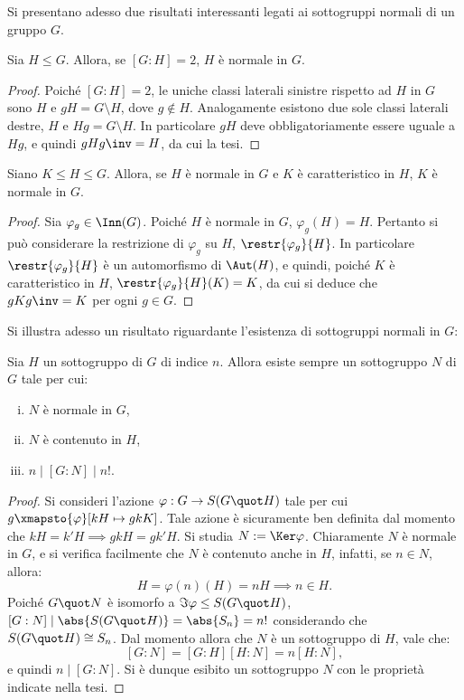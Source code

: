 \documentclass[12pt]{scrartcl}
\begin{document}
	
	Si presentano adesso due risultati interessanti legati ai sottogruppi normali di
	un gruppo $G$.
	
	\begin{proposition}
		Sia $H \leq G$. Allora, se $[G : H] = 2$, $H$ è normale in $G$.
	\end{proposition}
	
	\begin{proof}
		Poiché $[G : H] = 2$, le uniche classi laterali sinistre rispetto ad $H$ in
		$G$ sono $H$ e $gH = G \setminus H$, dove $g \notin H$. Analogamente esistono
		due sole classi laterali destre, $H$ e $Hg = G \setminus H$. In particolare
		$gH$ deve obbligatoriamente essere uguale a $Hg$, e quindi $gHg\inv = H$, da
		cui la tesi.
	\end{proof}
	
	\begin{proposition}
		Siano $K \leq H \leq G$. Allora, se $H$ è normale in $G$ e $K$ è caratteristico
		in $H$, $K$ è normale in $G$.
	\end{proposition}
	
	\begin{proof}
		Sia $\varphi_g \in \Inn(G)$. Poiché $H$ è normale in $G$, $\varphi_g(H) = H$. Pertanto
		si può considerare la restrizione di $\varphi_g$ su $H$, $\restr{\varphi_g}{H}$.
		In particolare $\restr{\varphi_g}{H}$ è un automorfismo di $\Aut(H)$, e quindi,
		poiché $K$ è caratteristico in $H$, $\restr{\varphi_g}{H}(K) = K$, da cui si
		deduce che $gKg\inv = K$ per ogni $g \in G$.
	\end{proof}
	
	Si illustra adesso un risultato riguardante l'esistenza di sottogruppi normali in $G$:
	\begin{theorem}[di Poincaré]
		Sia $H$ un sottogruppo di $G$ di indice $n$. Allora esiste sempre un sottogruppo
		$N$ di $G$ tale per cui:
		\begin{enumerate}[(i)]
			\item $N$ è normale in $G$,
			\item $N$ è contenuto in $H$,
			\item $n \mid [G : N] \mid n!$.
		\end{enumerate}
	\end{theorem}
	
	\begin{proof}
		Si consideri l'azione $\varphi : G \to S(G \quot H)$ tale per cui
		$g \xmapsto{\varphi} [kH \mapsto gkK]$. Tale azione è sicuramente
		ben definita dal momento che $kH = k'H \implies gkH = gk'H$. Si
		studia $N := \Ker \varphi$. Chiaramente $N$ è normale in $G$, e si
		verifica facilmente che $N$ è contenuto anche in $H$, infatti, se
		$n \in N$, allora:
		\[ H = \varphi(n)(H) = nH \implies n \in H. \]
		Poiché $G \quot N$ è isomorfo a $\Im \varphi \leq S(G \quot H)$,
		$[G : N] \mid \abs{S(G \quot H)} = \abs{S_n} = n!$ considerando che
		$S(G \quot H) \cong S_n$. Dal momento allora che $N$ è un sottogruppo
		di $H$, vale che:
		\[ [G : N] = [G : H] [H : N] = n [H : N], \]
		e quindi $n \mid [G : N]$. Si è dunque esibito un sottogruppo $N$ con
		le proprietà indicate nella tesi.
	\end{proof}
	
\end{document}
